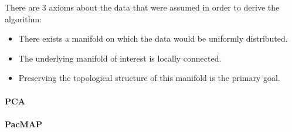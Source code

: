 There are 3 axioms about the data that were assumed in order to derive the algorithm:

\begin{itemize}
    \item There exists a manifold on which the data would be uniformly distributed.
    \item The underlying manifold of interest is locally connected.
    \item Preserving the topological structure of this manifold is the primary goal.
\end{itemize}


\paragraph{PCA}
\paragraph{PacMAP}